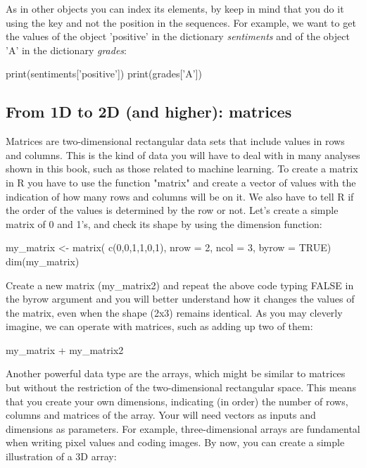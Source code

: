 As in other objects you can index its elements, by keep in mind that you do it using the key and not the position in the sequences. For example, we want to get the values of the object 'positive' in the dictionary \emph{sentiments} and of the object 'A' in the dictionary \emph{grades}:

\begin{examplepy}
print(sentiments['positive'])
print(grades['A'])
\end{examplepy}






\subsection{From 1D to 2D (and higher): matrices}


Matrices are two-dimensional rectangular data sets that include values in rows and columns. This is the kind of data you will have to deal with in many analyses shown in this book, such as those related to machine learning.  To create a matrix in R you have to use the function "matrix" and create a vector of values with the indication of how many rows and columns will be on it. We also have to tell R if the order of the values is determined by the row or not.  Let’s create a simple matrix of 0 and 1’s, and check its shape by using the dimension function:

\begin{exampler}
my_matrix <- matrix( c(0,0,1,1,0,1), nrow = 2, ncol = 3, byrow = TRUE)
dim(my_matrix)
\end{exampler}

Create a new matrix (my\_matrix2) and repeat the above code typing FALSE in the byrow argument and you will better understand how it changes the values of the matrix, even when the shape (2x3) remains identical. As you may cleverly imagine, we can operate with matrices, such as adding up two of them:

\begin{exampler}
my_matrix + my_matrix2
\end{exampler}

Another powerful data type are the arrays, which might be similar to matrices but without the restriction of the two-dimensional rectangular space. This means that you create your own dimensions, indicating (in order) the number of rows, columns and matrices of the array. Your will need vectors as inputs and dimensions as parameters. For example, three-dimensional arrays are fundamental when writing pixel values and coding images.  By now, you can create a simple illustration of a 3D array:

